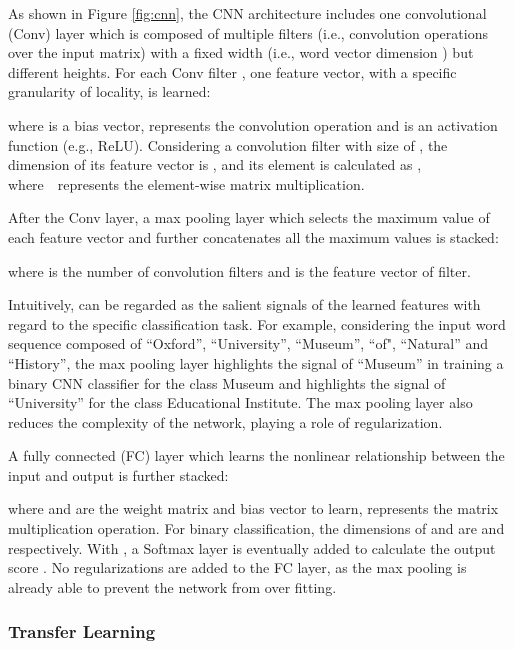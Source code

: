 \documentclass[letterpaper]{article}
\newcommand{\rv}[1]{{\color{black}#1}}
\newcommand{\camera}[1]{{\color{black}#1}}
\begin{document}
As shown in Figure \ref{fig:cnn},
the CNN architecture includes one convolutional (Conv) layer 
which is composed of multiple filters (i.e., convolution operations over the input matrix) with a fixed width (i.e., word vector dimension ) but different heights. 
For each Conv filter ,
one feature vector, 
with a specific granularity of locality, 
is learned:

where 
 is a bias vector,
 represents the convolution operation
and  is an activation function \rv{(e.g., ReLU)}.
\camera{Considering} a convolution filter with size of ,
the dimension of its feature vector  is ,
and its  element is calculated as ,
where~~represents the element-wise matrix multiplication.

After the Conv layer, 
\rv{a max pooling layer which selects the maximum value of each feature vector and further concatenates all the maximum values
is stacked:}

where  is the number of convolution filters and 
 is the feature vector of  filter. 


Intuitively,  can be regarded as the salient signals of the learned features with regard to the specific classification task.
For example, considering the input word sequence composed of ``Oxford'', ``University'', ``Museum'', ``of", ``Natural'' and ``History'', 
the max pooling layer highlights the signal of ``Museum'' in training a binary CNN classifier for the class Museum
and highlights the signal of ``University'' for the class Educational Institute.
The max pooling layer also reduces the complexity of the network, 
playing a role of regularization.

A fully connected (FC) layer which learns the nonlinear relationship between the input and output is further stacked:

where  and  are the weight matrix and bias vector to learn,
 represents the matrix multiplication operation.
For binary classification, 
the dimensions of  and  are  and  respectively.
\rv{With , a Softmax layer is eventually added to calculate the output score .}
No regularizations are added to the FC layer,
as the max pooling is already able to prevent the network from over fitting.



\subsubsection{Transfer Learning}
\end{document}
